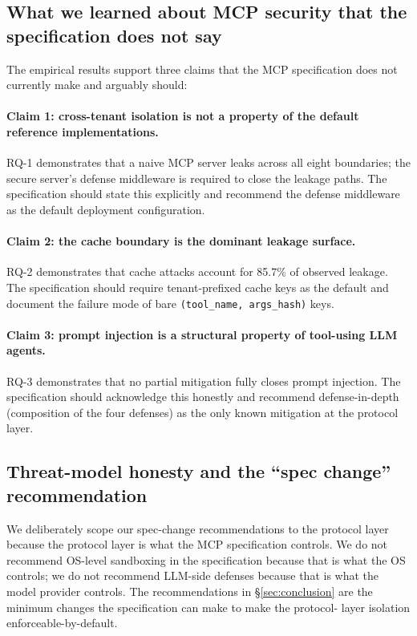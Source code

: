 \subsection{What we learned about MCP security that the
specification does not say}

The empirical results support three claims that the MCP
specification does not currently make and arguably should:

\paragraph{Claim 1: cross-tenant isolation is not a
property of the default reference implementations.} RQ-1
demonstrates that a naive MCP server leaks across all eight
boundaries; the secure server's defense middleware is
required to close the leakage paths. The specification
should state this explicitly and recommend the defense
middleware as the default deployment configuration.

\paragraph{Claim 2: the cache boundary is the dominant
leakage surface.} RQ-2 demonstrates that cache attacks
account for 85.7\% of observed leakage. The specification
should require tenant-prefixed cache keys as the default
and document the failure mode of bare
\texttt{(tool\_name, args\_hash)} keys.

\paragraph{Claim 3: prompt injection is a structural property
of tool-using LLM agents.} RQ-3 demonstrates that no
partial mitigation fully closes prompt injection. The
specification should acknowledge this honestly and
recommend defense-in-depth (composition of the four
defenses) as the only known mitigation at the protocol
layer.

\subsection{Threat-model honesty and the ``spec change''
recommendation}

We deliberately scope our spec-change recommendations to the
protocol layer because the protocol layer is what the MCP
specification controls. We do not recommend OS-level
sandboxing in the specification because that is what the OS
controls; we do not recommend LLM-side defenses because
that is what the model provider controls. The
recommendations in \S\ref{sec:conclusion} are the minimum
changes the specification can make to make the protocol-
layer isolation enforceable-by-default.

